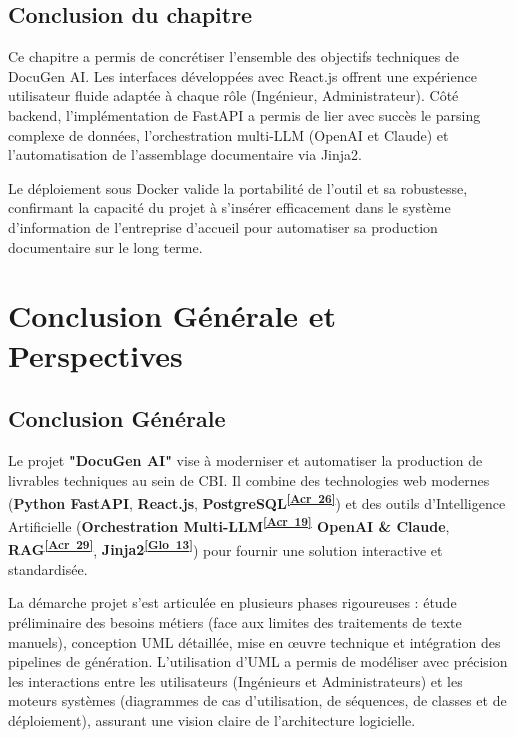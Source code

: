 \documentclass[12pt, a4paper]{report}
\newcommand{\acref}[1]{\textsuperscript{\hyperlink{acr:#1}{[Acr~#1]}}}
\newcommand{\gloref}[1]{\textsuperscript{\hyperlink{glo:#1}{[Glo~#1]}}}
\begin{document}
\section*{Conclusion du chapitre}
Ce chapitre a permis de concrétiser l’ensemble des objectifs techniques de DocuGen AI. Les interfaces développées avec React.js offrent une expérience utilisateur fluide adaptée à chaque rôle (Ingénieur, Administrateur). Côté backend, l'implémentation de FastAPI a permis de lier avec succès le parsing complexe de données, l'orchestration multi-LLM (OpenAI et Claude) et l'automatisation de l'assemblage documentaire via Jinja2. 

Le déploiement sous Docker valide la portabilité de l'outil et sa robustesse, confirmant la capacité du projet à s'insérer efficacement dans le système d'information de l'entreprise d'accueil pour automatiser sa production documentaire sur le long terme.



\chapter*{Conclusion Générale et Perspectives}

\section*{Conclusion Générale}

Le projet \textbf{"DocuGen AI"} vise à moderniser et automatiser la production de livrables techniques au sein de CBI. Il combine des technologies web modernes (\textbf{Python FastAPI}, \textbf{React.js}, \textbf{PostgreSQL\acref{26}}) et des outils d'Intelligence Artificielle (\textbf{Orchestration Multi-LLM\acref{19} OpenAI \& Claude}, \textbf{RAG\acref{29}}, \textbf{Jinja2\gloref{13}}) pour fournir une solution interactive et standardisée.



La démarche projet s’est articulée en plusieurs phases rigoureuses : étude préliminaire des besoins métiers (face aux limites des traitements de texte manuels), conception UML détaillée, mise en œuvre technique et intégration des pipelines de génération. L’utilisation d’UML a permis de modéliser avec précision les interactions entre les utilisateurs (Ingénieurs et Administrateurs) et les moteurs systèmes (diagrammes de cas d’utilisation, de séquences, de classes et de déploiement), assurant une vision claire de l'architecture logicielle.
\end{document}
